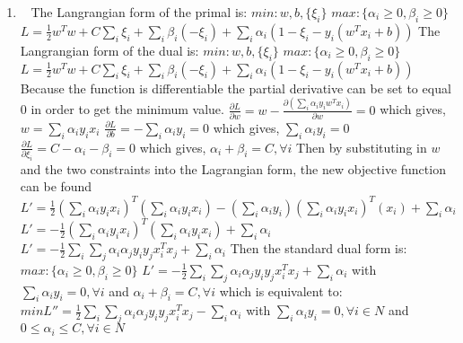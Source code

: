 \documentclass[12pt, fullpage,letterpaper]{article}
\begin{document}
\begin{enumerate}
	
	\item~
	\newline The Langrangian form of the primal is:
	\newline $min:w,b,\{\xi_i\}$ $max:\{\alpha_i\ge0,\beta_i\ge0\}$  
	\newline $L=\frac{1}{2}w^Tw+C\sum_i\xi_i+\sum_i \beta_i(-\xi_i)+\sum_i\alpha_i(1-\xi_i-y_i(w^Tx_i+b))$
	\newline The Langrangian form of the dual is:
	\newline $min:w,b,\{\xi_i\}$ $max:\{\alpha_i\ge0,\beta_i\ge0\}$  
	\newline $L=\frac{1}{2}w^Tw+C\sum_i\xi_i+\sum_i \beta_i(-\xi_i)+\sum_i\alpha_i(1-\xi_i-y_i(w^Tx_i+b))$
	\newline 
	\newline Because the function is differentiable the partial derivative can be set to equal 0 in order to get the minimum value.
	\newline
	\newline $\frac{\partial L}{\partial w}=w-\frac{\partial (\sum_i \alpha_i y_iw^Tx_i)}{\partial w}=0$
	\newline which gives, $w=\sum_i \alpha_i y_ix_i$
	\newline 
	\newline $\frac{\partial L}{\partial b}=-\sum_i\alpha_iy_i=0$
	\newline which gives, $\sum_i\alpha_iy_i=0$
	\newline 
	\newline $\frac{\partial L}{\partial \xi_i}=C-\alpha_i-\beta_i=0$
	\newline which gives, $\alpha_i+\beta_i=C,\forall i$
	\newline
	\newline Then by substituting in $w$ and the two constraints into the Lagrangian form, the new objective function can be found
	\newline
	\newline $L'=\frac{1}{2}(\sum_i\alpha_iy_ix_i)^T(\sum_i\alpha_iy_ix_i)-(\sum_i\alpha_iy_i)(\sum_i\alpha_iy_ix_i)^T(x_i)+\sum_i\alpha_i$
	\newline $L'=-\frac{1}{2}(\sum_i\alpha_iy_ix_i)^T(\sum_i\alpha_iy_ix_i)+\sum_i\alpha_i$
	\newline $L'=-\frac{1}{2}\sum_i\sum_j\alpha_i\alpha_jy_iy_jx_i^Tx_j+\sum_i\alpha_i$
	\newline
	\newline Then the standard dual form is:
	\newline $max:\{\alpha_i\ge0,\beta_i\ge0\}$ $L'=-\frac{1}{2}\sum_i\sum_j\alpha_i\alpha_jy_iy_jx_i^Tx_j+\sum_i\alpha_i$
	\newline with $\sum_i\alpha_iy_i=0, \forall i$ and $\alpha_i+\beta_i=C, \forall i$
	\newline which is equivalent to:
	\newline $min L''=\frac{1}{2}\sum_i\sum_j\alpha_i\alpha_jy_iy_jx_i^Tx_j-\sum_i\alpha_i$
	\newline with $\sum_i\alpha_iy_i=0, \forall i \in N$ and $0\le\alpha_i\le C, \forall i \in N$
	

\end{enumerate}
\end{document}
